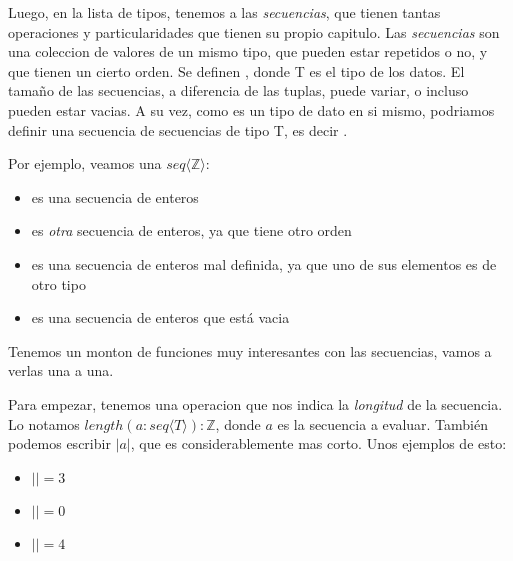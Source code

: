 \documentclass{article}
\begin{document}
Luego, en la lista de tipos, tenemos a las \textit{secuencias}, que tienen tantas operaciones y particularidades que tienen su propio capitulo. Las \textit{secuencias} son una coleccion de valores de un mismo tipo, que pueden estar repetidos o no, y que tienen un cierto orden. Se definen , donde T es el tipo de los datos. El tamaño de las secuencias, a diferencia de las tuplas, puede variar, o incluso pueden estar vacias. A su vez, como  es un tipo de dato en si mismo, podriamos definir una secuencia de secuencias de tipo T, es decir .

Por ejemplo, veamos una $seq \langle \mathbb{Z} \rangle$:

\begin{center}
	\begin{itemize}
	
		\item {} es una secuencia de enteros

		\item {} es \textit{otra} secuencia de enteros, ya que tiene otro orden

		\item {} es una secuencia de enteros mal definida, ya que uno de sus elementos es de otro tipo
		
		\item \lista{} es una secuencia de enteros que está vacia
	
	\end{itemize}
\end{center}

Tenemos un monton de funciones muy interesantes con las secuencias, vamos a verlas una a una.

Para empezar, tenemos una operacion que nos indica la \textit{longitud} de la secuencia. Lo notamos $length(a : seq \langle T \rangle) : \mathbb{Z}$, donde $a$ es la secuencia a evaluar. También podemos escribir $|a|$, que es considerablemente mas corto. Unos ejemplos de esto:

\begin{multicols}{3}
\begin{center}
	\begin{itemize}
	
		\item[] $|$$| = 3$
		\item[] $|$\lista{}$| = 0$
		\item[] $|$$| = 4$
	
	\end{itemize}
\end{center}
\end{multicols}
\end{document}
